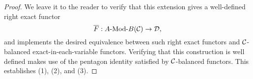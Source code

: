 \documentclass{amsart}
\begin{document}
\begin{proof}
We leave it to the reader to verify that this extension gives a well-defined right exact functor 
\begin{equation*}
	\overline{F}: \Mod{A}{B}(\cC) \to \cD,
\end{equation*} 
and implements the desired equivalence between such right exact functors and $\mathcal C$-balanced exact-in-each-variable functors. Verifying that this construction is well defined makes use of the pentagon identity satisfied by $\mathcal C$-balanced functors. This establishes (1), (2), and (3). 


\end{proof}
\end{document}
